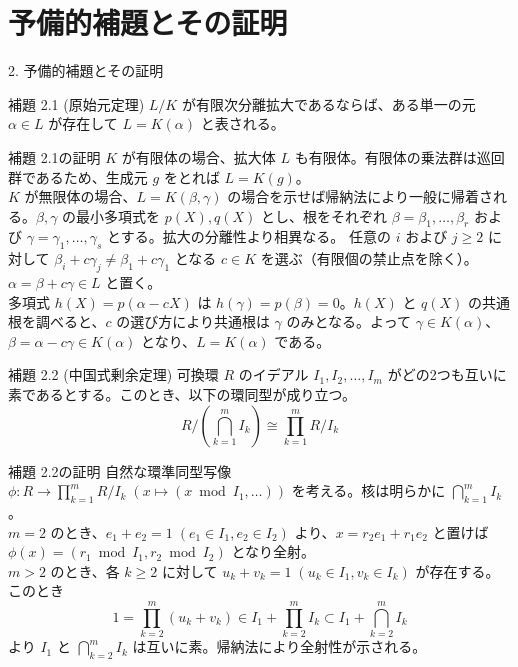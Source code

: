 \documentclass[11pt]{beamer}
\begin{document}
\section{予備的補題とその証明}
\begin{frame}[allowframebreaks]{2. 予備的補題とその証明}
    \begin{block}{補題 2.1 (原始元定理)}
        $L/K$ が有限次分離拡大であるならば、ある単一の元 $\alpha \in L$ が存在して $L = K(\alpha)$ と表される。
    \end{block}
    \begin{block}{補題 2.1の証明}
        $K$ が有限体の場合、拡大体 $L$ も有限体。有限体の乗法群は巡回群であるため、生成元 $g$ をとれば $L = K(g)$。\\
        $K$ が無限体の場合、$L = K(\beta, \gamma)$ の場合を示せば帰納法により一般に帰着される。$\beta, \gamma$ の最小多項式を $p(X), q(X)$ とし、根をそれぞれ $\beta=\beta_1, \dots, \beta_r$ および $\gamma=\gamma_1, \dots, \gamma_s$ とする。拡大の分離性より相異なる。
        任意の $i$ および $j \geq 2$ に対して $\beta_i + c\gamma_j \neq \beta_1 + c\gamma_1$ となる $c \in K$ を選ぶ（有限個の禁止点を除く）。$\alpha = \beta + c\gamma \in L$ と置く。\\
        多項式 $h(X) = p(\alpha - cX)$ は $h(\gamma) = p(\beta) = 0$。$h(X)$ と $q(X)$ の共通根を調べると、$c$ の選び方により共通根は $\gamma$ のみとなる。よって $\gamma \in K(\alpha)$、$\beta = \alpha - c\gamma \in K(\alpha)$ となり、$L = K(\alpha)$ である。
    \end{block}

    \begin{block}{補題 2.2 (中国式剰余定理)}
        可換環 $R$ のイデアル $I_1, I_2, \dots, I_m$ がどの2つも互いに素であるとする。このとき、以下の環同型が成り立つ。
        \[ R/\left( \bigcap_{k=1}^m I_k \right) \cong \prod_{k=1}^m R/I_k \]
    \end{block}
    \begin{block}{補題 2.2の証明}
        自然な環準同型写像 $\phi: R \to \prod_{k=1}^m R/I_k \; (x \mapsto (x \bmod I_1, \dots))$ を考える。核は明らかに $\bigcap_{k=1}^m I_k$。\\
        $m=2$ のとき、$e_1 + e_2 = 1 \; (e_1 \in I_1, e_2 \in I_2)$ より、$x = r_2 e_1 + r_1 e_2$ と置けば $\phi(x) = (r_1 \bmod I_1, r_2 \bmod I_2)$ となり全射。\\
        $m > 2$ のとき、各 $k \geq 2$ に対して $u_k + v_k = 1 \; (u_k \in I_1, v_k \in I_k)$ が存在する。このとき
        \[ 1 = \prod_{k=2}^m (u_k + v_k) \in I_1 + \prod_{k=2}^m I_k \subset I_1 + \bigcap_{k=2}^m I_k \]
        より $I_1$ と $\bigcap_{k=2}^m I_k$ は互いに素。帰納法により全射性が示される。
    \end{block}


\end{frame}
\end{document}
